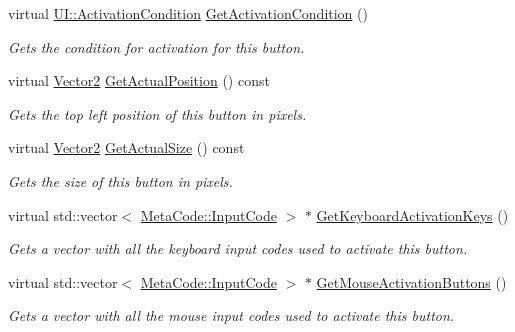 \begin{DoxyCompactItemize}
virtual \hyperlink{namespaceMezzanine_1_1UI_aca58497951b1b9c7da10f214da3392f0}{UI::ActivationCondition} \hyperlink{classMezzanine_1_1UI_1_1Button_a09b751800679937e1b1e79b33c164397}{GetActivationCondition} ()
\begin{DoxyCompactList}\small\item\em Gets the condition for activation for this button. \item\end{DoxyCompactList}\item 
virtual \hyperlink{classMezzanine_1_1Vector2}{Vector2} \hyperlink{classMezzanine_1_1UI_1_1Button_a5c1e8f0a8efe73d6d556f876a4c709f8}{GetActualPosition} () const 
\begin{DoxyCompactList}\small\item\em Gets the top left position of this button in pixels. \item\end{DoxyCompactList}\item 
virtual \hyperlink{classMezzanine_1_1Vector2}{Vector2} \hyperlink{classMezzanine_1_1UI_1_1Button_a19adecf3f260923b07016347623dc33e}{GetActualSize} () const 
\begin{DoxyCompactList}\small\item\em Gets the size of this button in pixels. \item\end{DoxyCompactList}\item 
virtual std::vector$<$ \hyperlink{classMezzanine_1_1MetaCode_a3b5633f0145bf3287cf53a3f05b5563c}{MetaCode::InputCode} $>$ $\ast$ \hyperlink{classMezzanine_1_1UI_1_1Button_ab0a32f06b46ae49813c9ad86e8346274}{GetKeyboardActivationKeys} ()
\begin{DoxyCompactList}\small\item\em Gets a vector with all the keyboard input codes used to activate this button. \item\end{DoxyCompactList}\item 
virtual std::vector$<$ \hyperlink{classMezzanine_1_1MetaCode_a3b5633f0145bf3287cf53a3f05b5563c}{MetaCode::InputCode} $>$ $\ast$ \hyperlink{classMezzanine_1_1UI_1_1Button_a41d41a678b9164806fff2a17acabf1ae}{GetMouseActivationButtons} ()
\begin{DoxyCompactList}\small\item\em Gets a vector with all the mouse input codes used to activate this button. \item\end{DoxyCompactList}\item 

\end{DoxyCompactItemize}
